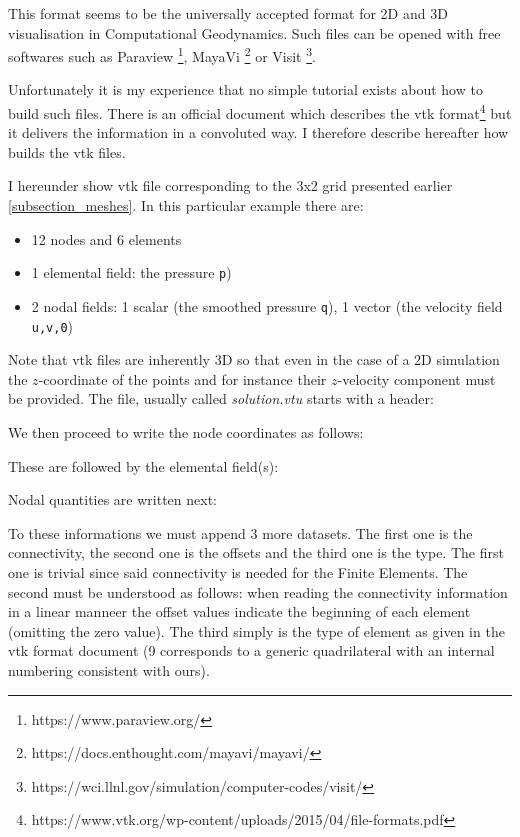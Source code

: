 
This format seems to be the universally accepted format for 2D and 3D visualisation in 
Computational Geodynamics. Such files can be opened with free softwares such as 
Paraview \footnote{https://www.paraview.org/}, MayaVi \footnote{https://docs.enthought.com/mayavi/mayavi/}
or Visit \footnote{https://wci.llnl.gov/simulation/computer-codes/visit/}.

Unfortunately it is my experience that no simple tutorial exists about how to build 
such files. There is an official document which describes the vtk 
format\footnote{https://www.vtk.org/wp-content/uploads/2015/04/file-formats.pdf}
but it delivers the information in a convoluted way. I therefore describe hereafter 
how \fieldstone{} builds the vtk files. 

I hereunder show vtk file corresponding to the 3x2 grid presented earlier \ref{subsection_meshes}.
In this particular example there are:
\begin{itemize}
\item 12 nodes and 6 elements
\item 1 elemental field: the pressure {\tt p})
\item 2 nodal fields: 1 scalar (the smoothed pressure {\tt q}), 1 vector (the velocity field {\tt u,v,0})
\end{itemize}
Note that vtk files are inherently 3D so that even in the case of a 2D simulation the $z$-coordinate 
of the points and for instance their $z$-velocity component must be provided.
The file, usually called {\sl solution.vtu} starts with a header:



We then proceed to write the node coordinates as follows:



These are followed by the elemental field(s):



Nodal quantities are written next:



To these informations we must append 3 more datasets. The first one is the connectivity, 
the second one is the offsets and the third one is the type. The first one is trivial
since said connectivity is needed for the Finite Elements. The second must be understood as follows:
when reading the connectivity information in a linear manneer the offset values 
indicate the beginning of each element (omitting the zero value). The third simply is the type of element 
as given in the vtk format document (9 corresponds to a generic quadrilateral with an 
internal numbering consistent with ours). 

